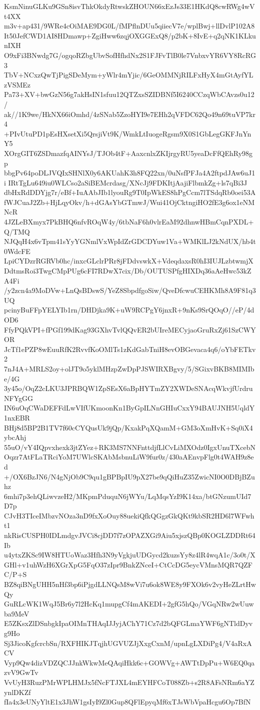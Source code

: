 KsmNinuGLKu9GSn8isvThkOkdyRtwskZHOUN66xEzJs33E1HKdQ8cwRWg4wVt4XX
m3v+ap431/9WRe4cOiMAE9DG0L/fMPflnDUu5qiiecV7e/wplBwj+llDvlP102A8
It50JefCWD1AI8HDmawp+ZgiHww6zqjOXGGExQ8/p2bK+8IvE+q2qNK1KLkunIXH
O9xFi3BNwdg7G/ogqoRZbgUbvSofHfhdNx2S1FJFvTlB0le7VnbxvYR6VY8RcRG3
TbV+NCxzQwTjPigSDeMym+yWlr4mYjic/6GeOMMNjRILFxHyX4mGtAyfYLzVSMEz
Pa73+XV+bwGzN56g7akHsIN1sfuu12QTZxsSZIDBNf5I6240CCzqWbCAvzs0u12/
ak//1K9we/HkNX66iOmhd/4zSNab5ZzoHYI9e7EHh2qVFDC62Qo49n69tuVP7kr4
+PIvUtuPD1pEsHXsetXi5QrsjiVt9K/WmkLtIuogeRgsm9X0S1GbLegGKFJnYnY5
XOrgGIT6ZSDmazfqAINYsJ/TJOb4tF+AaxcnlxZKIjrgyRU5yeaDcFfQEhRy98gp
bbgPv64poDLJVQIxSHNlX0y6AKUahK3h8FQ22xn/0uNsfPFJa4A2ftpdJAw6uJ1i
IRtTgLu649iu0WLCso2aSiBEMcrdasg/XNcJj9FDKItjAajiFlbmkZg+ls7qBi3J
dbHxRdDDYjg7r/eBf+IuAAbJIb1lyouRg9T0IpWkES8hPgCcm7lTSdqRb0oei53A
fWJCuaJ2Zb+HjLqyOkv/h+dGAsYbGTmwJ/Wui41OjCktngiHO2fE3g6ox1eNMNcR
4JZLeBXmyx7PkBHQ6nfvROqW4y/6tbNaF6h0vlrEaM92dhnwHBmCqnPXDL+Q/TMQ
NJQqH4x6vTpm41sYyYGNmlVxWpIdZrGDCDYuw1Va+WMKlLJ2kNdUX/hb4t0WdcFE
LpiCYDzrRGRVb0hc/inxcGLclrPRr8jFDdvswkX+VdeqdaxsR0hI3IUJLzbtwmjX
DdtmsRoi3TwgCMpPUg6cFI7RDwX7cix/Db/OUTUSPfgHIXDq36aAeHwc53kZA4Fi
/y2zcn4a9MoDVw+LnQsBDswS/YeZ8SbpdfgoSiw/QveDfcwuCEHKMh8A9F81q3UQ
pcinyBuFFpYELYIb1rn/DHDjka9K+uW9RCPgY6jnxR+9nKs9SrQOqO//eP/4dOD6
FfyPQkVPI+fPGf199dKag93GXhvTvlQQvER2bUIreMECyjaoGruRxZj61SzCWYOR
JcTf1ePZP8wEuuRfK2RvvfKoOMlTs1zKdGabTniH8evOBGevaca4q6/oYbFETkv2
7nJ4A+MRLS2oy+olJT9o5yklMHzpZwDpPJSWIRXBgvy/5/SGixvBKB8MIMIbe/4G
3y45o/OqZ2cLKU3JPRBQW1ZpSEsX6aBpHYTmZY2XWDeSNAcqWkvjfUrdruNFYgGG
IN6uOqCWaDEFFdLwVIfUKmoonKn1ByGpILNnGHIuCxxY94BAUJNH5UqldY1nxEBR
BHj8d5BP2B1TV7f60cCYQusUk9jQp/KxakPqXQamM+GM3oXmHvK+Sq0iX4ybcAhj
55uO/vY4IQpvxhexk3jtZYez+RK3MS7NNFnttdjfLlCvLiMXOdz0IgxUnuTXcebN
Oqzr7AtFLaTRciYoM7UWlcSKAbMsbnuLiW9fur0z/430aAEnvpFlg0t4WAH9z8ed
+/OX6BzJN6/N4gNjOb9C9qu1gBPBpIU9pX27be9qQiHuZ35ZwicNI0O0DBjBZuhz
6mhi7p3ehQLiwvzeH2/MKpmPduquN6jWYu/LqMqsYzI9K14xa/btGNzumUId7D7p
CJvH3TIceIMbzvNOza3nD9fxXoOuy88uekiQfkQGgzGkQKt9kbSR2HD6l7WFwht1
nkRisCUSPH0IDLmdgvJVCi8cjDD7f7zOPAZXGi9Aiu5xjszQBp0KOGLZDDRt64Ib
u4ytxZKSc9IW8HTUoWaz3Hfh3N9yVgkjuUDGycd2kuzsYy8z4lR4wqA1c/3o0t/X
GHl+v1uhWzH6XGrXpG5FqO37zIpr9BnkZNceI+CtCcDG5eycVMnsMQR7QZFC/P+S
BZ8qiBNgUHH5nHf3bp6iPjgdLLNQsM8wVi7u6ok8WE8y9FXOk6v2vyHeZLrtHwQy
GuRLcWK1WqJ5Br6y7l2HcKq1mupgCf4mAKEDI+2gfG5hQo/VGqNRw2wUuwba9MeV
E5ZKsxZlDSnbgkIpaOIMnTHAqIJJyjAChY71Cz7d2bQFGLmaYWF6gNTldDyvg9Ho
Sj3JicoKgfcrcbSn/RXFHIKJTqjhUGVUZJjXxgCxnM/upnLgLXDiPg4/V4aRxACV
Vyp9Qw4dizVDZQCJJnkWkwMeQAqiHkk6c+GOWVg+AWTtDpPu+W6EQ0qazvV9GwTv
VvUyH3RuzPMrWPLHMJx5fNcFTJXL4mEYHFCoT088Zb+s2R8AFsNRm6aYZynlDKZf
fIa4x3eUNyYltE1x3JhW1gsIyI9Zl0Gup8QFlEpyqMf6xTJsWbVpaHcgu6Op7BfN
